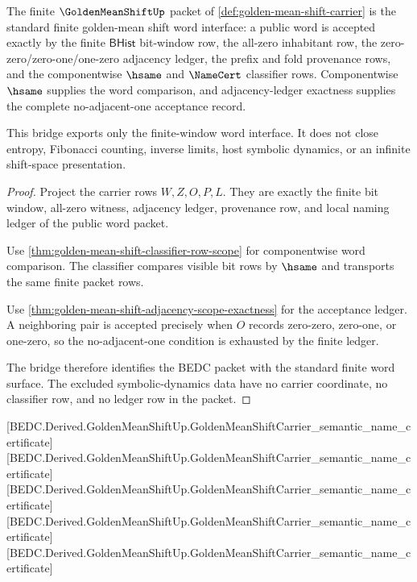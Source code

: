 \begin{theorem}
\label{thm:golden-mean-shift-finite-window-standard-bridge}
The finite $\GoldenMeanShiftUp$ packet of \autoref{def:golden-mean-shift-carrier} is the standard finite golden-mean shift word interface: a public word is accepted exactly by the finite $\mathsf{BHist}$ bit-window row, the all-zero inhabitant row, the zero-zero/zero-one/one-zero adjacency ledger, the prefix and fold provenance rows, and the componentwise $\hsame$ and $\NameCert$ classifier rows. Componentwise $\hsame$ supplies the word comparison, and adjacency-ledger exactness supplies the complete no-adjacent-one acceptance record.

This bridge exports only the finite-window word interface. It does not close entropy, Fibonacci counting, inverse limits, host symbolic dynamics, or an infinite shift-space presentation.
\end{theorem}
\begin{proof}
Project the carrier rows $W,Z,O,P,L$. They are exactly the finite bit window, all-zero witness, adjacency ledger, provenance row, and local naming ledger of the public word packet.

Use \autoref{thm:golden-mean-shift-classifier-row-scope} for componentwise word comparison. The classifier compares visible bit rows by $\hsame$ and transports the same finite packet rows.

Use \autoref{thm:golden-mean-shift-adjacency-scope-exactness} for the acceptance ledger. A neighboring pair is accepted precisely when $O$ records zero-zero, zero-one, or one-zero, so the no-adjacent-one condition is exhausted by the finite ledger.

The bridge therefore identifies the BEDC packet with the standard finite word surface. The excluded symbolic-dynamics data have no carrier coordinate, no classifier row, and no ledger row in the packet.
\end{proof}

[BEDC.Derived.GoldenMeanShiftUp.GoldenMeanShiftCarrier\_semantic\_name\_certificate]
[BEDC.Derived.GoldenMeanShiftUp.GoldenMeanShiftCarrier\_semantic\_name\_certificate]
[BEDC.Derived.GoldenMeanShiftUp.GoldenMeanShiftCarrier\_semantic\_name\_certificate]
[BEDC.Derived.GoldenMeanShiftUp.GoldenMeanShiftCarrier\_semantic\_name\_certificate]
[BEDC.Derived.GoldenMeanShiftUp.GoldenMeanShiftCarrier\_semantic\_name\_certificate]

